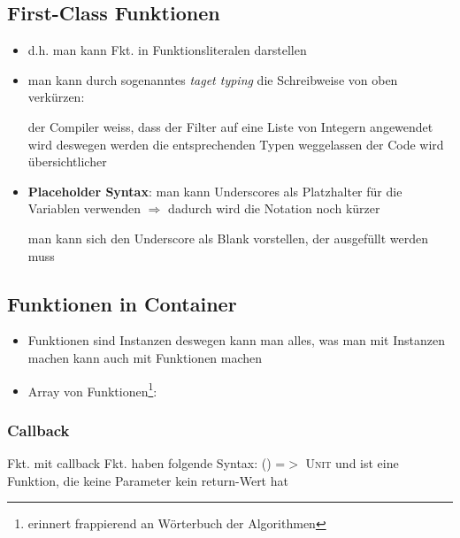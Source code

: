 \subsection{First-Class Funktionen}
\begin{itemize}
  \item d.h. man kann Fkt. in Funktionsliteralen
  darstellen
  
  

  \item man kann durch sogenanntes \textit{taget typing} die
  Schreibweise von oben verkürzen:
  
  
  
  der Compiler weiss, dass der Filter auf eine Liste von Integern
  angewendet wird \und deswegen werden die entsprechenden Typen
  weggelassen \und der Code wird übersichtlicher
  
  \item \textbf{Placeholder Syntax}: man kann Underscores als 
  Platzhalter für die Variablen verwenden $\Rightarrow$ dadurch
  wird die Notation noch kürzer
  
  
  
  man kann sich den Underscore als Blank vorstellen, der ausgefüllt
  werden muss
  
\end{itemize}


\subsection{Funktionen in Container}
\begin{itemize}
  \item Funktionen sind Instanzen \und deswegen kann man alles, was man
  mit Instanzen machen kann auch mit Funktionen machen
  \item Array von Funktionen\footnote{erinnert frappierend an
  Wörterbuch der Algorithmen}:
  
  
    
\end{itemize}


\subsubsection{Callback}
Fkt. mit callback Fkt. haben folgende Syntax: 
  \textsc{() =$>$ Unit} und ist eine Funktion, die keine Parameter \und 
  kein return-Wert hat
  
